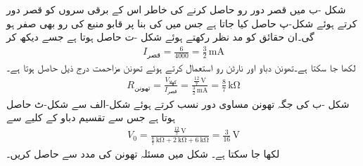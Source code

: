 شکل -ب میں قصر دور رو حاصل کرنے کی خاطر اس کے برقی سروں کو قصر دور کرتے ہوئے شکل-پ حاصل کیا جاتا ہے جس میں  کی بنا پر قابو منبع کی رو بھی صفر ہو گی۔ان حقائق کو مد نظر رکھتے ہوئے شکل -ت حاصل ہوتا ہے جسے دیکھ کر 
\begin{align*}
I_{\text{قصر}}=\frac{6}{4000}=\frac{3}{2}\, \si{\milli\ampere}
\end{align*}
لکھا جا سکتا ہے۔تھونن دباو اور نارٹن رو استعمال کرتے ہوئے  تھونن مزاحمت درج ذیل حاصل ہوتا ہے۔
\begin{align*}
R_{\text{تھونن}}=\frac{V_{\text{کھلا}}}{I_{\text{قصر}}}  = \frac{\frac{12}{7} \, \si{\volt}}{\frac{3}{2} \, \si{\milli\ampere}}=\frac{8}{7} \, \si{\kilo\ohm}
\end{align*}
شکل -ب کی جگہ تھونن مساوی دور نسب کرتے ہوئے شکل-الف سے شکل-ٹ حاصل ہوتا ہے جس سے تقسیم دباو کے کلیے سے 
\begin{align*}
V_0=\frac{\frac{12}{7} \, \si{\volt}}{\frac{8}{7} \, \si{\kilo\ohm}+\SI{2}{\kilo\ohm}+\SI{6}{\kilo\ohm}}=\frac{3}{16} \, \si{\volt}
\end{align*}
لکھا جا سکتا ہے۔ 
شکل  میں مسئلہ تھونن کی مدد سے  حاصل کریں۔
